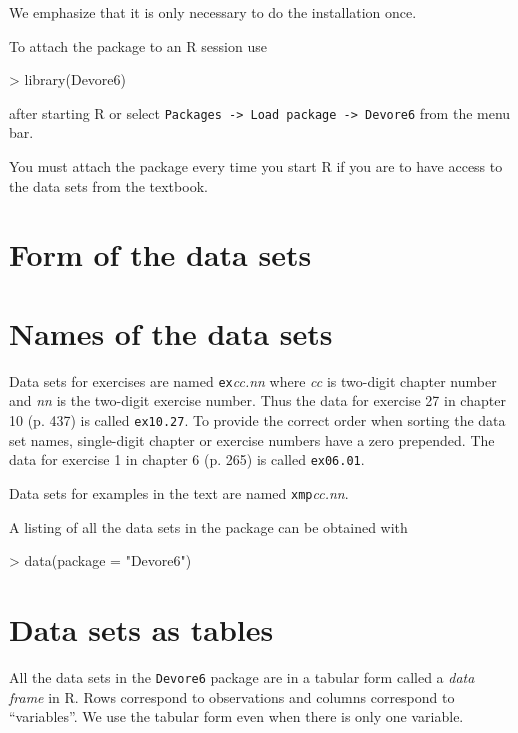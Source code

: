 \documentclass{book}
\begin{document}
We emphasize that it is only necessary to do the installation once.

To attach the package to an R session use
\begin{Schunk}
\begin{Sinput}
> library(Devore6)
\end{Sinput}
\end{Schunk}
after starting R or select \texttt{Packages -> Load package ->
  Devore6} from the menu bar.

You must attach the package every time you start R if you are to have
access to the data sets from the textbook.


\section{Form of the data sets}
\label{sec:Form}

\section{Names of the data sets}
\label{sec:DSnames}

Data sets for exercises are named \texttt{ex}\textit{cc.nn} where
\textit{cc} is two-digit chapter number and \textit{nn} is the
two-digit exercise number.  Thus the data for exercise 27 in chapter
10 (p. 437) is called \texttt{ex10.27}.  To provide the correct order
when sorting the data set names, single-digit chapter or exercise
numbers have a zero prepended.  The data for exercise 1 in chapter 6
(p. 265) is called \texttt{ex06.01}.

Data sets for examples in the text are named \texttt{xmp}\textit{cc.nn}.

A listing of all the data sets in the package can be obtained with
\begin{Schunk}
\begin{Sinput}
> data(package = "Devore6")
\end{Sinput}
\end{Schunk}

\section{Data sets as tables}
\label{sec:DataTables}

All the data sets in the \texttt{Devore6} package are in a tabular
form called a \emph{data frame} in R.  Rows correspond to
observations and columns correspond to ``variables''.  We use the
tabular form even when there is only one variable.
\end{document}
